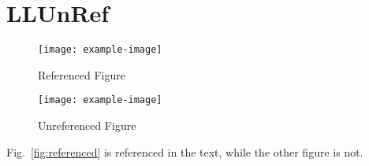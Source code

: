 \section{LLUnRef}

\begin{figure}[htbp]
  \begin{minipage}{0.5\columnwidth}
    \centering
    \texttt{[image: example-image]}
    \caption{Referenced Figure}
    \label{fig:referenced}
  \end{minipage}%
  \begin{minipage}{0.5\columnwidth}
    \centering
    \texttt{[image: example-image]}
    \caption{Unreferenced Figure}
    \label{fig:unreferenced}
  \end{minipage}
\end{figure}

Fig.~\ref{fig:referenced} is referenced in the text, while the other figure is not.
